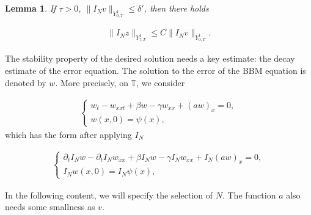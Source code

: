 \documentclass[10pt,a4paper,final]{article}
\numberwithin{equation}{section}
\newtheorem{lemma}[theorem]{Lemma}
\begin{document}
\begin{lemma}\label{le5-5}
If $\tau>0$, $\|I_Nv\|_{Y^1_{0,T}}\le \delta'$, then there holds

\begin{eqnarray}
\|I_Nz\|_{Y^1_{\tau, T}}\le C\|I_N v\|_{Y^1_{0,T}}. 
\end{eqnarray}
\end{lemma}

 The stability property of the desired solution needs a key estimate: the decay estimate of the error equation. The solution to the error of the BBM equation is denoted by $w$. More precisely, on $\mathbb{T}$, we consider

\begin{eqnarray}\label{5-6}
\begin{cases}
w_t - w_{xxt} +\beta w- \gamma w_{xx} + (aw)_x = 0,\\
w(x, 0) = \psi(x),
\end{cases}
\end{eqnarray}
which has the form after applying $I_N$

\begin{eqnarray}\label{7-6}
\begin{cases}
\partial_tI_Nw - \partial_tI_Nw_{xx} +\beta I_Nw - \gamma I_N w_{xx} + I_N(aw)_x = 0,\\
I_Nw(x, 0) = I_N \psi(x),
\end{cases}
\end{eqnarray}

In the following content, we will specify the selection of $N$.  The function $a$ also needs some smallness as $v$. 
\end{document}
